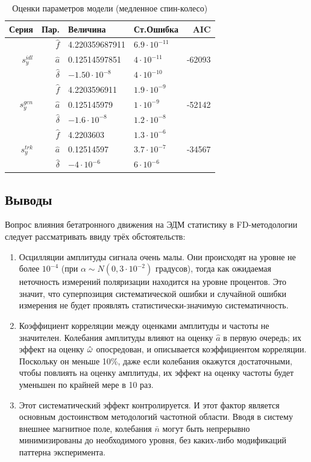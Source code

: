 \begin{table}[h]\centering
	\caption{Оценки параметров модели (медленное спин-колесо)\label{tbl:param_estimates}}
	\begin{tabular}{r|rllr}
		\toprule
		Серия & Пар. & Величина & Ст.Ошибка & AIC \\
		\midrule
		\multirow{3}{*}{$s_y^{idl}$}
		& $\hat f$ & 4.220359687911 & $6.9\cdot10^{-11}$ & \multirow{3}{*}{-62093} \\
		& $\hat a$ & 0.12514597851 & $4\cdot10^{-11}$ & \\
		& $\hat\delta$ & $-1.50\cdot10^{-8}$ & $4\cdot 10^{-10}$ &\\
		\hline
		\multirow{3}{*}{$s_y^{gen}$}
		& $\hat f$ & 4.2203596911 & $1.9\cdot 10^{-9}$ & \multirow{3}{*}{-52142} \\
		& $\hat a$ & 0.125145979 & $1\cdot 10^{-9}$ & \\
		& $\hat\delta$ & $-1.6\cdot 10^{-8}$ & $1.2\cdot 10^{-8}$ &\\
		\hline
		\multirow{3}{*}{$s_y^{trk}$}
		& $\hat f$ & 4.2203603 & $1.3\cdot 10^{-6}$ & \multirow{3}{*}{-34567} \\
		& $\hat a$ & 0.12514597 & $3.7\cdot10^{-7}$ & \\
		& $\hat\delta$ & $-4\cdot10^{-6}$ & $6\cdot 10^{-6}$ &\\
		\bottomrule
	\end{tabular}
\end{table}

\subsection{Выводы}
Вопрос влияния бетатронного движения на ЭДМ статистику в FD-методологии следует рассматривать
ввиду трёх обстоятельств:
\begin{enumerate}
\item Осцилляции амплитуды сигнала очень малы. Они происходят на уровне не более $10^{-4}$ (при
  ${\alpha\sim N(0, 3\cdot 10^{-2})}$ градусов), тогда как ожидаемая неточность измерений поляризации находится
  на уровне процентов. Это значит, что суперпозиция систематической ошибки и случайной ошибки измерения
  не будет проявлять статистически-значимую систематичность.
\item Коэффициент корреляции между оценками амплитуды и частоты не значителен. Колебания амплитуды
  влияют на оценку $\hat a$ в первую очередь; их эффект на оценку $\hat{\omega}$ опосредован, и описывается
  коэффициентом корреляции. Поскольку он меньше 10\%, даже если колебания окажутся достаточными, чтобы повлиять
  на оценку амплитуды, их эффект на оценку частоты будет уменьшен по крайней мере в 10 раз.
\item Этот систематический эффект контролируется. И этот фактор является основным достоинством методологий
  частотной области. Вводя в систему внешнее магнитное поле, колебания $\bar n$ могут быть 
  непрерывно минимизированы  до необходимого уровня, без каких-либо модификаций паттерна эксперимента.
\end{enumerate}
